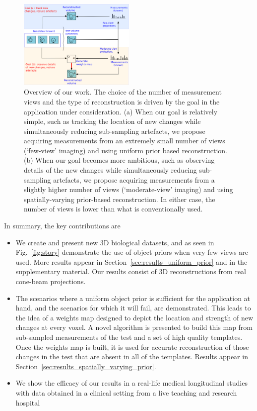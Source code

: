 \documentclass[journal]{IEEEtran}
\begin{document}
 \begin{figure}[h]
\centering
	\includegraphics[width=0.5\textwidth]{../images/prior_cmb.png}
        \caption{Overview of our work. The choice of the number of
          measurement views and the type of reconstruction is driven
          by the goal in the application under consideration.  (a) When
          our goal is relatively simple, such as tracking the location
          of new changes while simultaneously reducing sub-sampling
          artefacts, we propose acquiring measurements from an
          extremely small number of views (`few-view' imaging) and
          using uniform prior based reconstruction. (b) When our goal
          becomes more ambitious, such as observing details of the new
          changes while simultaneously reducing sub-sampling
          artefacts, we propose acquiring measurements from a
          slightly higher number of views (`moderate-view' imaging)
          and using spatially-varying prior-based reconstruction. In
          either case, the number of views is lower than what is
          conventionally used.}
 \label{fig:prior_overview}
\end{figure}

In summary, the key contributions are
\begin{itemize}
\item We create and present new 3D biological datasets, and as seen in
  Fig.~\ref{fig:story} demonstrate the use of object priors when very
  few views are used. More results appear in
  Section~\ref{sec:results_uniform_prior} and in the supplementary
  material.  Our results consist of 3D reconstructions from real
  cone-beam projections.
  \item The scenarios where a uniform object prior is sufficient for
    the application at hand, and the scenarios for which it will fail,
    are demonstrated. This leads to the idea of a weights map
    designed to depict the location and strength of new changes at
    every voxel. A novel algorithm is presented to build this map from
    sub-sampled measurements of the test and a set of high quality
    templates. Once the weights map is built, it is used for accurate
    reconstruction of those changes in the test that are absent in all
    of the templates. Results appear in
    Section~\ref{sec:results_spatially_varying_prior}.
  \item We show the efficacy of our results in a real-life medical
    longitudinal studies with data obtained in a clinical setting from
    a live teaching and
    research hospital 
 \end{itemize}
\end{document}

